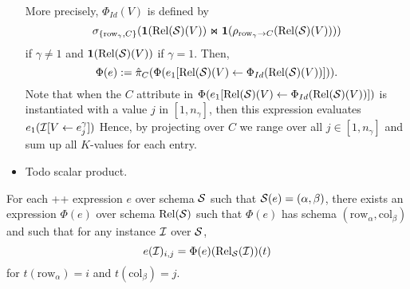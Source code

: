 \begin{itemize}
	More precisely, $\Phi_{Id}(V)$ is  defined by
	$$
	\sigma_{\{\mathrm{row}_\gamma,C\}}(\mathbf{1}(\text{Rel}(\mathcal{S})(V)) \Join \mathbf{1}(\rho_{\mathrm{row}_\gamma \to C}(\text{Rel}(\mathcal{S})(V))))$$
	if $\gamma \neq 1$ and
   $\mathbf{1}(\text{Rel}(\mathcal{S})(V))$ if $\gamma = 1$.
   Then,
	$$
	\Phi(e):=\hat{\pi}_C(\Phi(e_1[\text{Rel}(\mathcal{S})(V)\gets \Phi_{Id}(\text{Rel}(\mathcal{S})(V))])).
	$$
	Note that when the $C$ attribute in $\Phi(e_1[\text{Rel}(\mathcal{S})(V)\gets \Phi_{Id}(\text{Rel}(\mathcal{S})(V))])$
	is instantiated with a value $j$ in $[1,n_\gamma]$, then this expression evaluates $e_1(\mathcal{I}[V\gets e_j^\gamma])$
	Hence, by projecting over $C$ we range over all $j\in[1,n_\gamma]$ and sum up all $K$-values for each entry.
	\item Todo scalar product.
\end{itemize}

\begin{proposition}
	For each \lang++ expression $e$ over schema $\mathcal{S}$ such that $\mathcal{S}(e)=(\alpha,\beta)$, there exists an \ARA expression $\Phi(e)$ over schema $\text{Rel}(\mathcal{S})$ such that $\Phi(e)$ has schema $(\mathrm{row}_\alpha,\mathrm{col}_\beta)$ and 
	such that for any instance $\mathcal{I}$ over $\mathcal{S}$,
	$$
	e(\mathcal{I})_{i,j}=\Phi(e)(\text{Rel}_{\mathcal{S}}(\mathcal{I}))(t)
	$$
	for $t(\mathrm{row}_\alpha)=i$ and $t(\mathrm{col}_\beta)=j$.
\end{proposition}
